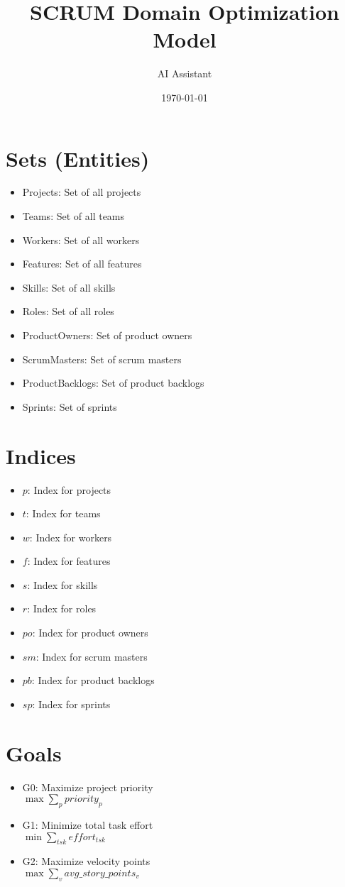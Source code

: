 \documentclass{article}
\title{SCRUM Domain Optimization Model}
\author{AI Assistant}
\date{\today}
\begin{document}
\maketitle

\tableofcontents

\section{Sets (Entities)}
\begin{itemize}
    \item Projects: Set of all projects
    \item Teams: Set of all teams
    \item Workers: Set of all workers
    \item Features: Set of all features
    \item Skills: Set of all skills
    \item Roles: Set of all roles
    \item ProductOwners: Set of product owners
    \item ScrumMasters: Set of scrum masters
    \item ProductBacklogs: Set of product backlogs
    \item Sprints: Set of sprints
\end{itemize}

\section{Indices}
\begin{itemize}
    \item $p$: Index for projects
    \item $t$: Index for teams
    \item $w$: Index for workers
    \item $f$: Index for features
    \item $s$: Index for skills
    \item $r$: Index for roles
    \item $po$: Index for product owners
    \item $sm$: Index for scrum masters
    \item $pb$: Index for product backlogs
    \item $sp$: Index for sprints
\end{itemize}

\section{Goals}
\begin{itemize}
    \item G0: Maximize project priority \\
          $\max \sum_{p} priority_p$
    \item G1: Minimize total task effort \\
          $\min \sum_{tsk} effort_{tsk}$
    \item G2: Maximize velocity points \\
          $\max \sum_{v} avg\_story\_points_v$
\end{itemize}
\end{document}
